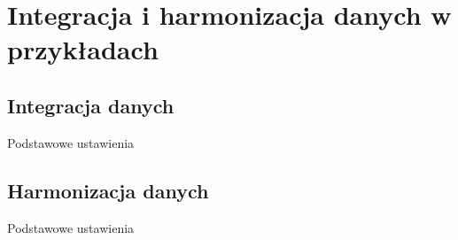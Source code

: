 \chapter{Integracja i harmonizacja danych w przykładach}
	\section{Integracja danych}
	Podstawowe ustawienia
	\section{Harmonizacja danych}
	Podstawowe ustawienia	 


